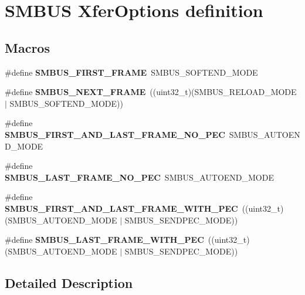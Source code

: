 \hypertarget{group___s_m_b_u_s___xfer_options__definition}{}\section{S\+M\+B\+US Xfer\+Options definition}
\label{group___s_m_b_u_s___xfer_options__definition}
\subsection*{Macros}
\begin{DoxyCompactItemize}
\item 
\mbox{\label{group___s_m_b_u_s___xfer_options__definition_ga0b757f14a97efcaf407555576ee2f606}} 
\#define {\bfseries S\+M\+B\+U\+S\+\_\+\+F\+I\+R\+S\+T\+\_\+\+F\+R\+A\+ME}~S\+M\+B\+U\+S\+\_\+\+S\+O\+F\+T\+E\+N\+D\+\_\+\+M\+O\+DE
\item 
\mbox{\label{group___s_m_b_u_s___xfer_options__definition_ga7a7fc60fe48eb76dcb93e1fca63ae3dd}} 
\#define {\bfseries S\+M\+B\+U\+S\+\_\+\+N\+E\+X\+T\+\_\+\+F\+R\+A\+ME}~((uint32\+\_\+t)(S\+M\+B\+U\+S\+\_\+\+R\+E\+L\+O\+A\+D\+\_\+\+M\+O\+DE $\vert$ S\+M\+B\+U\+S\+\_\+\+S\+O\+F\+T\+E\+N\+D\+\_\+\+M\+O\+DE))
\item 
\mbox{\label{group___s_m_b_u_s___xfer_options__definition_ga37fb621818e1d90dee3a3ed4588a21b2}} 
\#define {\bfseries S\+M\+B\+U\+S\+\_\+\+F\+I\+R\+S\+T\+\_\+\+A\+N\+D\+\_\+\+L\+A\+S\+T\+\_\+\+F\+R\+A\+M\+E\+\_\+\+N\+O\+\_\+\+P\+EC}~S\+M\+B\+U\+S\+\_\+\+A\+U\+T\+O\+E\+N\+D\+\_\+\+M\+O\+DE
\item 
\mbox{\label{group___s_m_b_u_s___xfer_options__definition_ga319828e7fb8ee16869530b9df245525c}} 
\#define {\bfseries S\+M\+B\+U\+S\+\_\+\+L\+A\+S\+T\+\_\+\+F\+R\+A\+M\+E\+\_\+\+N\+O\+\_\+\+P\+EC}~S\+M\+B\+U\+S\+\_\+\+A\+U\+T\+O\+E\+N\+D\+\_\+\+M\+O\+DE
\item 
\mbox{\label{group___s_m_b_u_s___xfer_options__definition_ga06e14f6df3d4d51a98816d8ab40ffd22}} 
\#define {\bfseries S\+M\+B\+U\+S\+\_\+\+F\+I\+R\+S\+T\+\_\+\+A\+N\+D\+\_\+\+L\+A\+S\+T\+\_\+\+F\+R\+A\+M\+E\+\_\+\+W\+I\+T\+H\+\_\+\+P\+EC}~((uint32\+\_\+t)(S\+M\+B\+U\+S\+\_\+\+A\+U\+T\+O\+E\+N\+D\+\_\+\+M\+O\+DE $\vert$ S\+M\+B\+U\+S\+\_\+\+S\+E\+N\+D\+P\+E\+C\+\_\+\+M\+O\+DE))
\item 
\mbox{\label{group___s_m_b_u_s___xfer_options__definition_gac6141ae3264f6372f6bfe4427110c85c}} 
\#define {\bfseries S\+M\+B\+U\+S\+\_\+\+L\+A\+S\+T\+\_\+\+F\+R\+A\+M\+E\+\_\+\+W\+I\+T\+H\+\_\+\+P\+EC}~((uint32\+\_\+t)(S\+M\+B\+U\+S\+\_\+\+A\+U\+T\+O\+E\+N\+D\+\_\+\+M\+O\+DE $\vert$ S\+M\+B\+U\+S\+\_\+\+S\+E\+N\+D\+P\+E\+C\+\_\+\+M\+O\+DE))
\end{DoxyCompactItemize}


\subsection{Detailed Description}

